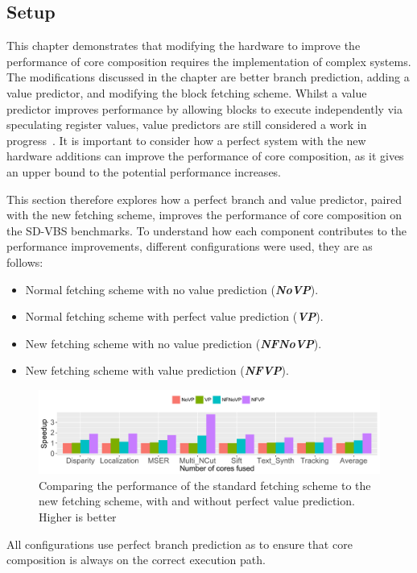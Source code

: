 \newcommand{\novp}{\textit{\textbf{NoVP}}}
\newcommand{\vp}{\textit{\textbf{VP}}}
\newcommand{\nfnovp}{\textit{\textbf{NFNoVP}}}
\newcommand{\nfvp}{\textit{\textbf{NFVP}}}

\newcommand{\optvp}{\textit{\textbf{OptVP}}}
\newcommand{\vt}{\textit{\textbf{VT}}}
\newcommand{\nfvt}{\textit{\textbf{NFVT}}}
\subsection{Setup}
This chapter demonstrates that modifying the hardware to improve the performance of core composition requires the implementation of complex systems.
The modifications discussed in the chapter are better branch prediction, adding a value predictor, and modifying the block fetching scheme.
Whilst a value predictor improves performance by allowing blocks to execute independently via speculating register values, value predictors are still considered a work in progress~\cite{peraisBeBop2015}.
It is important to consider how a perfect system with the new hardware additions can improve the performance of core composition, as it gives an upper bound to the potential performance increases.

This section therefore explores how a perfect branch and value predictor, paired with the new fetching scheme, improves the performance of core composition on the SD-VBS benchmarks.
To understand how each component contributes to the performance improvements, different configurations were used, they are as follows:
\begin{itemize}
\item Normal fetching scheme with no value prediction (\novp).
\vspace{-1em}
\item Normal fetching scheme with perfect value prediction (\vp).
\vspace{-1em}
\item New fetching scheme with no value prediction (\nfnovp).
\vspace{-1em}
\item New fetching scheme with value prediction (\nfvp).
\end{itemize}

\begin{figure}[t]
    \centering
    \includegraphics[width=1\textwidth]{chapter3/graphics/tempres.pdf}
    \caption{Comparing the performance of the standard fetching scheme to the new fetching scheme, with and without perfect value prediction. Higher is better}
    \label{fig:perf_pred}
\end{figure}
All configurations use perfect branch prediction as to ensure that core composition is always on the correct execution path.


